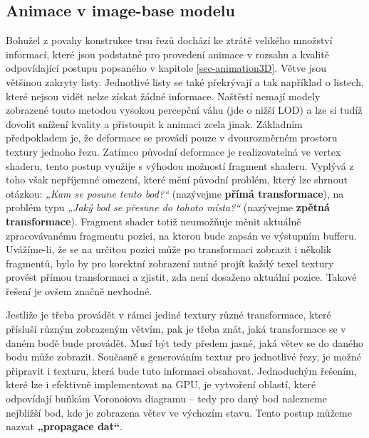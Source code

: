 \subsection{Animace v image-base modelu}
\label{sec-ibAnimation}

Bohužel z povahy konstrukce trsu řezů dochází ke ztrátě velikého množství informací, které jsou podstatné pro provedení animace v rozsahu a kvalitě odpovídající postupu popsaného v kapitole \ref{sec-animation3D}. Větve jsou většinou zakryty listy. Jednotlivé listy se také překrývají a tak například o listech, které nejsou vidět nelze získat žádné informace. Naštěstí nemají modely zobrazené touto metodou vysokou percepční váhu (jde o nižší LOD) a lze si tudíž dovolit snížení kvality a přistoupit k animaci zcela jinak.
Základním předpokladem je, že deformace se provádí pouze v dvourozměrném prostoru textury jednoho řezu. Zatímco původní deformace je realizovatelná ve vertex shaderu, tento postup využije s výhodou možností fragment shaderu. Vyplývá z toho však nepříjemné omezení, které mění původní problém, který lze shrnout otázkou: \emph{„Kam se posune tento bod?“} (nazývejme {\bf přímá transformace}), na problém typu \emph{„Jaký bod se přesune do tohoto místa?“} (nazývejme {\bf zpětná transformace}). Fragment shader totiž neumožňuje měnit aktuálně zpracovávanému fragmentu pozici, na kterou bude zapsán ve výstupním bufferu. Uvážíme-li, že se na určitou pozici může po transformaci zobrazit i několik fragmentů, bylo by pro korektní zobrazení nutné projít každý texel textury provést přímou transformaci a zjistit, zda není dosaženo aktuální pozice. Takové řešení je ovšem značně nevhodné.

Jestliže je třeba provádět v rámci jediné textury různé transformace, které přísluší různým zobrazeným větvím, pak je třeba znát, jaká transformace se v daném bodě bude provádět. Musí být tedy předem jasné, jaká větev se do daného bodu může zobrazit. Současně s generováním textur pro jednotlivé řezy, je možné připravit i texturu, která bude tuto informaci obsahovat. Jednoduchým řešením, které lze i efektivně implementovat na GPU, je vytvoření oblastí, které odpovídají buňkám Voronoiova diagramu – tedy pro daný bod nalezneme nejbližší bod, kde je zobrazena větev ve výchozím stavu. Tento postup můžeme nazvat {\bf „propagace dat“}.

